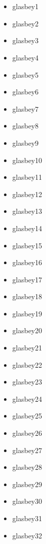 \documentclass{article}
\begin{document}
\newpage
\section{\textcite{glasbey-2007-colour}}

\begin{multicols}{2}
    \begin{itemize}
        \item \textcolor{glasbey1}{glasbey1}
        \item \textcolor{glasbey2}{glasbey2}
        \item \textcolor{glasbey3}{glasbey3}
        \item \textcolor{glasbey4}{glasbey4}
        \item \textcolor{glasbey5}{glasbey5}
        \item \textcolor{glasbey6}{glasbey6}
        \item \textcolor{glasbey7}{glasbey7}
        \item \textcolor{glasbey8}{glasbey8}
        \item \textcolor{glasbey9}{glasbey9}
        \item \textcolor{glasbey10}{glasbey10}
        \item \textcolor{glasbey11}{glasbey11}
        \item \textcolor{glasbey12}{glasbey12}
        \item \textcolor{glasbey13}{glasbey13}
        \item \textcolor{glasbey14}{glasbey14}
        \item \textcolor{glasbey15}{glasbey15}
        \item \textcolor{glasbey16}{glasbey16}
        \item \textcolor{glasbey17}{glasbey17}
        \item \textcolor{glasbey18}{glasbey18}
        \item \textcolor{glasbey19}{glasbey19}
        \item \textcolor{glasbey20}{glasbey20}
        \item \textcolor{glasbey21}{glasbey21}
        \item \textcolor{glasbey22}{glasbey22}
        \item \textcolor{glasbey23}{glasbey23}
        \item \textcolor{glasbey24}{glasbey24}
        \item \textcolor{glasbey25}{glasbey25}
        \item \textcolor{glasbey26}{glasbey26}
        \item \textcolor{glasbey27}{glasbey27}
        \item \textcolor{glasbey28}{glasbey28}
        \item \textcolor{glasbey29}{glasbey29}
        \item \textcolor{glasbey30}{glasbey30}
        \item \textcolor{glasbey31}{glasbey31}
        \item \textcolor{glasbey32}{glasbey32}
    \end{itemize}
\end{multicols}

\newpage
\printbibliography
\end{document}
